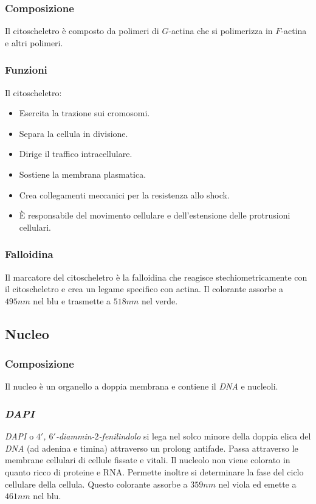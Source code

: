 		\subsubsection{Composizione}
		Il citoscheletro \`e composto da polimeri di $G$-actina che si polimerizza in $F$-actina e altri polimeri.

		\subsubsection{Funzioni}
		Il citoscheletro:
		\begin{multicols}{2}
			\begin{itemize}
				\item Esercita la trazione sui cromosomi.
				\item Separa la cellula in divisione.
				\item Dirige il traffico intracellulare.
				\item Sostiene la membrana plasmatica.
				\item Crea collegamenti meccanici per la resistenza allo shock.
				\item \`E responsabile del movimento cellulare e dell'estensione delle protrusioni cellulari.
			\end{itemize}
		\end{multicols}

		\subsubsection{Falloidina}
		Il marcatore del citoscheletro \`e la falloidina che reagisce stechiometricamente con il citoscheletro e crea un legame specifico con actina.
		Il colorante assorbe a $495\si{nm}$ nel blu e trasmette a $518\si{nm}$ nel verde.
		
	\subsection{Nucleo}

		\subsubsection{Composizione}
		Il nucleo \`e un organello a doppia membrana e contiene il \emph{DNA} e nucleoli.

		\subsubsection{\emph{DAPI}}
		\emph{DAPI} o \emph{$4'$, $6'$-diammin-$2$-fenilindolo} si lega nel solco minore della doppia elica del \emph{DNA} (ad adenina e timina) attraverso un prolong antifade.
		Passa attraverso le membrane cellulari di cellule fissate e vitali.
		Il nucleolo non viene colorato in quanto ricco di proteine e RNA.
		Permette inoltre si determinare la fase del ciclo cellulare della cellula.
		Questo colorante assorbe a $359\si{nm}$ nel viola ed emette a $461\si{nm}$ nel blu.

